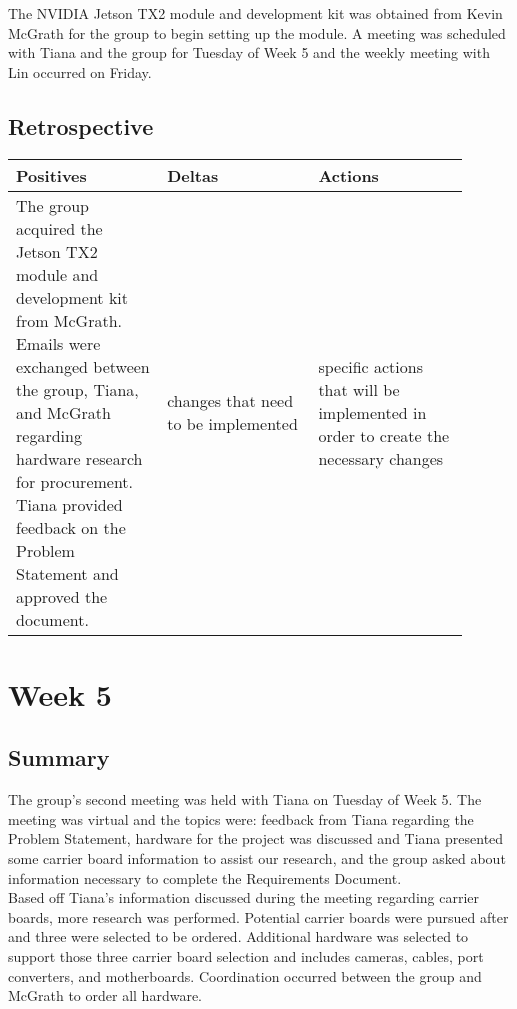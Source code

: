 \documentclass[letterpaper,10pt,serif,draftclsnofoot,onecolumn,compsoc,titlepage]{IEEEtran}
\begin{document}
The NVIDIA Jetson TX2 module and development kit was obtained from Kevin McGrath for 
the group to begin setting up the module.
A meeting was scheduled with Tiana and the group for Tuesday of Week 5 and the weekly 
meeting with Lin occurred on Friday.\\

\subsection{Retrospective}

\begin{tabular}{|p{0.3\linewidth}|p{0.3\linewidth}|p{0.3\linewidth}|}
   \hline
   \textbf{Positives} & \textbf{Deltas} & \textbf{Actions}\\ 
   \hline
   The group acquired the Jetson TX2 module and development kit from McGrath. 
   Emails were exchanged between the group, Tiana, and McGrath regarding hardware 
   research for procurement. Tiana provided feedback on the Problem Statement 
   and approved the document. 
   & 
   changes that need to be implemented 
   & 
   specific actions that will be implemented in order to create the necessary 
   changes \\
   \hline
\end{tabular}

\section{Week 5}

\subsection{Summary}

The group's second meeting was held with Tiana on Tuesday of Week 5. The meeting was 
virtual and the topics were: feedback from Tiana regarding the Problem Statement, 
hardware for the project was discussed and Tiana presented some carrier board information 
to assist our research, and the group asked about information necessary to complete 
the Requirements Document. \\

Based off Tiana's information discussed during the meeting regarding carrier boards,
more research was performed. Potential carrier boards were pursued after and three 
were selected to be ordered. Additional hardware was selected to support those three 
carrier board selection and includes cameras, cables, port converters, and 
motherboards. Coordination occurred between the group and McGrath to order all 
hardware. \\
\end{document}
